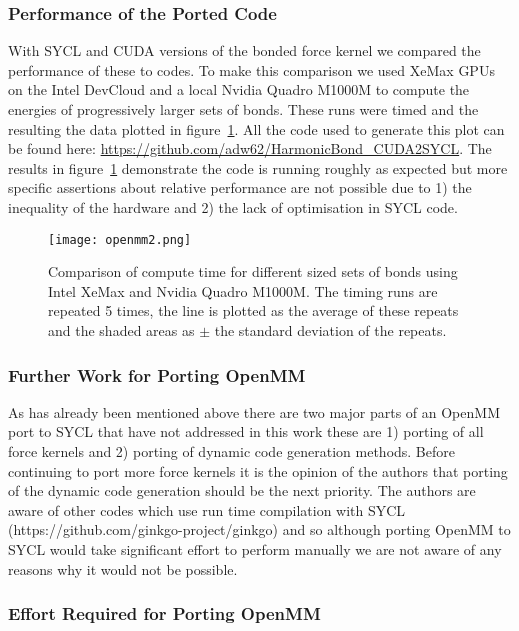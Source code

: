 \documentclass[../main]{subfiles}
\begin{document}
\subsubsection{Performance of the Ported Code}\label{sec:openmm_performance}


With SYCL and CUDA versions of the bonded force kernel we compared the performance of these to codes.
To make this comparison we used XeMax GPUs on the Intel DevCloud and a local Nvidia Quadro M1000M to compute the energies of progressively larger sets of bonds.
These runs were timed and the resulting the data plotted in figure~\ref{fig:openmm}.
All the code used to generate this plot can be found here: \url{https://github.com/adw62/HarmonicBond_CUDA2SYCL}. The results in figure~\ref{fig:openmm} demonstrate the code is running roughly as expected but more specific assertions about relative performance are not possible due to 1) the inequality of the hardware and 2) the lack of optimisation in SYCL code.

\begin{figure}[!htbp]
	\caption{Comparison of compute time for different sized sets of bonds using Intel XeMax and Nvidia Quadro M1000M. The timing runs are repeated 5 times, the line is plotted as the average of these repeats and the shaded areas as $\pm$ the standard deviation of the repeats.}
	\texttt{[image: openmm2.png]}
	\label{fig:openmm}
\end{figure}

\subsubsection{Further Work for Porting OpenMM}\label{sec:openmm_furtherwork}

As has already been mentioned above there are two major parts of an OpenMM port to SYCL that have not addressed in this work these are 1) porting of all force kernels and 2) porting of dynamic code generation methods.
Before continuing to port more force kernels it is the opinion of the authors that porting of the dynamic code generation should be the next priority. The authors are aware of other codes which use run time compilation with SYCL (https://github.com/ginkgo-project/ginkgo) and so although porting OpenMM to SYCL would take significant effort to perform manually we are not aware of any reasons why it would not be possible.


\subsubsection{Effort Required for Porting OpenMM}\label{sec:openmm_effort}
\end{document}
